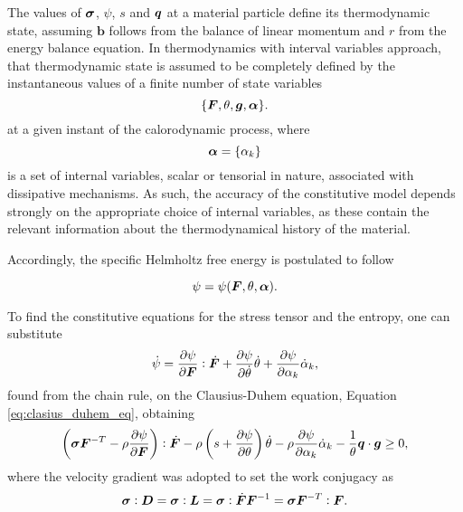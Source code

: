 The values of $\bm{\sigma}$, $\psi$, $s$ and $\bm{q}$ at a material particle define its thermodynamic state, assuming \(\bm b\) follows from the balance of linear momentum and \(r\) from the energy balance equation.
In thermodynamics with interval variables approach, that thermodynamic state is assumed to be completely defined by the instantaneous values of a finite number of state variables
\begin{equation}
    \{\bm{F}, \theta, \bm{g}, \bm{\alpha}\}.
\end{equation}
at a given instant of the calorodynamic process, where
\begin{equation}
    \bm{\alpha} = \{\alpha_k\}
\end{equation}
is a set of internal variables, scalar or tensorial in nature, associated with dissipative mechanisms.
As such, the accuracy of the constitutive model depends strongly on the appropriate choice of internal variables, as these contain the relevant information about the thermodynamical history of the material.

Accordingly, the specific Helmholtz free energy is postulated to follow
\begin{highlight}
    \begin{equation}
        \psi = \psi(\bm{F}, \theta, \bm{\alpha}).
    \end{equation}
\end{highlight}
To find the constitutive equations for the stress tensor and the entropy, one can substitute
\begin{equation}
    \dot \psi = \frac{\partial \psi}{\partial \bm{F}}:\dot{\bm{F}} + \frac{\partial \psi}{\partial \dot \theta}\dot \theta + \frac{\partial \psi}{\partial \alpha_k}\dot \alpha_k,
\end{equation}
found from the chain rule, on the Clausius-Duhem equation, Equation \eqref{eq:clasius_duhem_eq}, obtaining
\begin{equation}
    \left(\bm{\sigma} \bm{F}^{-T} -\rho\frac{\partial \psi}{\partial \bm{F}}\right):\dot{\bm{F}} -\rho \left(s+\frac{\partial \psi}{\partial \theta}\right)\dot \theta - \rho \frac{\partial \psi}{\partial \alpha_k}\dot\alpha_k - \frac{1}{\theta}\bm{q} \cdot \bm{g}\geq 0,\label{eq:clausius_duhem_energy}
\end{equation}
where the velocity gradient was adopted to set the work conjugacy as
\begin{equation}
    \bm{\sigma} :\bm{D} = \bm{\sigma} :\bm{L} = \bm{\sigma} :\dot{\bm{F}}\bm{F}^{-1} = \bm{\sigma} \bm{F}^{-T}:\bm{F}.
\end{equation}

